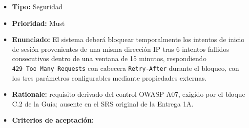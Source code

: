 \documentclass[
  spanish,
]{article}
\providecommand{\tightlist}{%
  \setlength{\itemsep}{0pt}\setlength{\parskip}{0pt}}
\begin{document}
\begin{itemize}
\tightlist
\item
  \textbf{Tipo:} Seguridad
\item
  \textbf{Prioridad:} Must
\item
  \textbf{Enunciado:} El sistema deberá bloquear temporalmente los
  intentos de inicio de sesión provenientes de una misma dirección IP
  tras 6 intentos fallidos consecutivos dentro de una ventana de 15
  minutos, respondiendo \texttt{429\ Too\ Many\ Reques\allowbreak{}ts} con cabecera
  \texttt{Retry-\allowbreak{}After} durante el bloqueo, con los tres parámetros
  configurables mediante propiedades externas.
\item
  \textbf{Rationale:} requisito derivado del control OWASP A07, exigido
  por el bloque C.2 de la Guía; ausente en el SRS original de la Entrega
  1A.
\item
  \textbf{Criterios de aceptación:}


\end{itemize}
\end{document}
